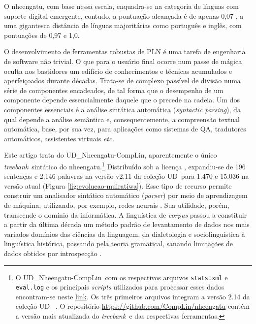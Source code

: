 \documentclass[portuguese]{textolivre}
\newcommand{\udc}{coleção UD}
\newcommand{\tbc}{UD\_Nheengatu-CompLin}
\newcommand{\tb}{\textit{treebank}}
\begin{document}
O nheengatu, com base nessa escala, enquadra-se na categoria de línguas com suporte digital emergente, contudo, a pontuação alcançada é de apenas 0,07 \parencite{eberhard-simons-fennig2023}, a uma gigantesca distância de línguas majoritárias como português e inglês, com pontuações de 0,97 e 1,0. 

O desenvolvimento de ferramentas robustas de PLN é uma tarefa de engenharia de software não trivial. O que para o usuário final ocorre num passe de mágica oculta nos bastidores um edifício de conhecimentos e técnicas acumulados e aperfeiçoados durante décadas. Trata-se de complexo passível de divisão numa série de componentes encadeados, de tal forma que o desempenho de um componente depende essencialmente daquele que o precede na cadeia. Um dos componentes essenciais é a análise sintática automática (\textit{syntactic parsing}), da qual depende a análise semântica e, consequentemente, a compreensão textual automática, base, por sua vez, para aplicações como sistemas de QA, tradutores automáticos, assistentes virtuais \textit{etc.} 

Este artigo trata do \tbc, aparentemente o único \tb~sintático do nheengatu.\footnote{O \tbc~com os respectivos arquivos \texttt{stats.xml} e \texttt{eval.log} e os principais \textit{scripts} utilizados para processar esses dados encontram-se neste \href{https://osf.io/t3uws/?view_only=265e1e44ff3f45e989d5f978ba7dfd80}{link}. Os três primeiros arquivos integram a versão 2.14 da \udc~ \parencite{zeman2024universal}. O repositório \url{https://github.com/CompLin/nheengatu} contém a versão mais atualizada do \tb~e das respectivas ferramentas.}  Distribuído sob a licença \href{https://creativecommons.org/licenses/by-nc-sa/4.0/}{\ccbyncsa}, expandiu-se de 196 sentenças e 2.146 palavras na versão v2.11 da \udc~para 1.470 e 15.036 na versão atual (Figura \ref{fig:evolucao-muiratiwa}). Esse tipo de recurso permite construir um analisador sintático automático (\textit{parser}) por meio de aprendizagem de máquina, utilizando, por exemplo, redes neurais \parencite{straka-etal-2016-udpipe-k}. Sua utilidade, porém, transcende o domínio da informática. A linguística de \textit{corpus} passou a constituir a partir da última década um método padrão de levantamento de dados nos mais variados domínios das ciências da linguagem, da dialetologia e sociolinguística à linguística histórica, passando pela teoria gramatical, sanando limitações de dados obtidos por introspecção \parencite{hirschmann2019korpuslinguistik}.
\end{document}

